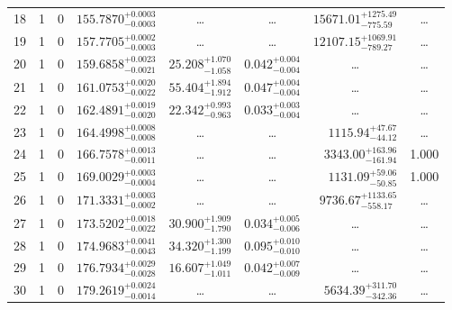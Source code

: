 \begin{table*}[!]
\begin{tabular}{llcrrlrc}
18 & 1 & 0 & $    155.7870_{-      0.0003}^{+      0.0003}$ & \multicolumn{1}{c}{\dots} & \multicolumn{1}{c}{\dots} & $    15671.01_{-      775.59}^{+     1275.49}$ & \dots \\[1pt]
19 & 1 & 0 & $    157.7705_{-      0.0003}^{+      0.0002}$ & \multicolumn{1}{c}{\dots} & \multicolumn{1}{c}{\dots} & $    12107.15_{-      789.27}^{+     1069.91}$ & \dots \\[1pt]
20 & 1 & 0 & $    159.6858_{-      0.0021}^{+      0.0023}$ & $      25.208_{-       1.058}^{+       1.070}$ & $       0.042_{-       0.004}^{+       0.004}$ & \multicolumn{1}{c}{\dots} & \dots \\[1pt]
21 & 1 & 0 & $    161.0753_{-      0.0022}^{+      0.0020}$ & $      55.404_{-       1.912}^{+       1.894}$ & $       0.047_{-       0.004}^{+       0.004}$ & \multicolumn{1}{c}{\dots} & \dots \\[1pt]
22 & 1 & 0 & $    162.4891_{-      0.0020}^{+      0.0019}$ & $      22.342_{-       0.963}^{+       0.993}$ & $       0.033_{-       0.004}^{+       0.003}$ & \multicolumn{1}{c}{\dots} & \dots \\[1pt]
23 & 1 & 0 & $    164.4998_{-      0.0008}^{+      0.0008}$ & \multicolumn{1}{c}{\dots} & \multicolumn{1}{c}{\dots} & $     1115.94_{-       44.12}^{+       47.67}$ & \dots \\[1pt]
24 & 1 & 0 & $    166.7578_{-      0.0011}^{+      0.0013}$ & \multicolumn{1}{c}{\dots} & \multicolumn{1}{c}{\dots} & $     3343.00_{-      161.94}^{+      163.96}$ & 1.000\\[1pt]
25 & 1 & 0 & $    169.0029_{-      0.0004}^{+      0.0003}$ & \multicolumn{1}{c}{\dots} & \multicolumn{1}{c}{\dots} & $     1131.09_{-       50.85}^{+       59.06}$ & 1.000\\[1pt]

26 & 1 & 0 & $    171.3331_{-      0.0002}^{+      0.0003}$ & \multicolumn{1}{c}{\dots} & \multicolumn{1}{c}{\dots} & $     9736.67_{-      558.17}^{+     1133.65}$ & \dots\\[1pt]
27 & 1 & 0 & $    173.5202_{-      0.0022}^{+      0.0018}$ & $      30.900_{-       1.790}^{+       1.909}$ & $       0.034_{-       0.006}^{+       0.005}$ & \multicolumn{1}{c}{\dots} & \dots \\[1pt]
28 & 1 & 0 & $    174.9683_{-      0.0043}^{+      0.0041}$ & $      34.320_{-       1.199}^{+       1.300}$ & $       0.095_{-       0.010}^{+       0.010}$ & \multicolumn{1}{c}{\dots} & \dots\\[1pt]
29 & 1 & 0 & $    176.7934_{-      0.0028}^{+      0.0029}$ & $      16.607_{-       1.011}^{+       1.049}$ & $       0.042_{-       0.009}^{+       0.007}$ & \multicolumn{1}{c}{\dots} & \dots\\[1pt]
30 & 1 & 0 & $    179.2619_{-      0.0014}^{+      0.0024}$ & \multicolumn{1}{c}{\dots} & \multicolumn{1}{c}{\dots} & $     5634.39_{-      342.36}^{+      311.70}$ & \dots\\[1pt]


\end{tabular}
\end{table*}
